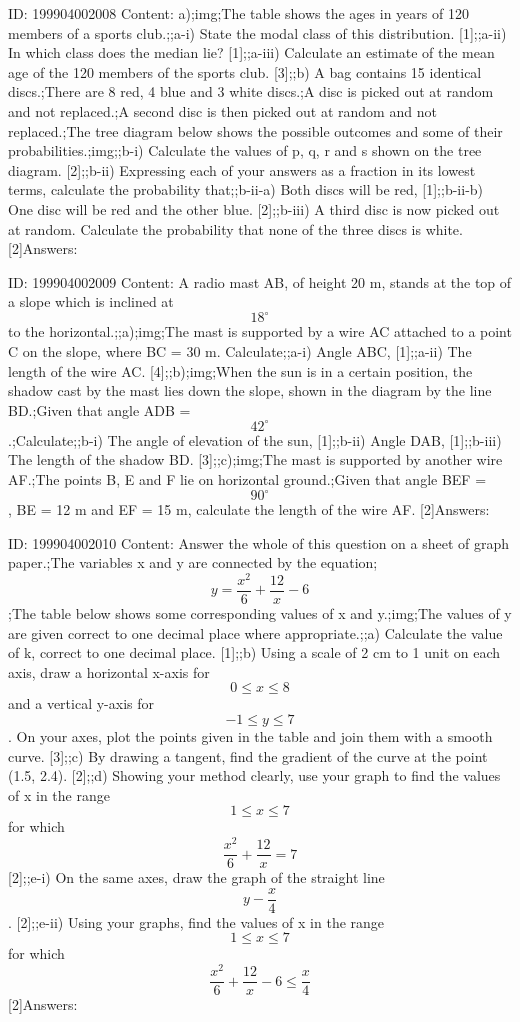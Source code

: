 \documentclass{article}
\begin{document}
ID: 199904002008
Content:
a);img;The table shows the ages in years of 120 members of a sports club.;;a-i) State the modal class of this distribution. [1];;a-ii) In which class does the median lie? [1];;a-iii) Calculate an estimate of the mean age of the 120 members of the sports club. [3];;b) A bag contains 15 identical discs.;There are 8 red, 4 blue and 3 white discs.;A disc is picked out at random and not replaced.;A second disc is then picked out at random and not replaced.;The tree diagram below shows the possible outcomes and some of their probabilities.;img;;b-i) Calculate the values of p, q, r and s shown on the tree diagram. [2];;b-ii) Expressing each of your answers as a fraction in its lowest terms, calculate the probability that;;b-ii-a) Both discs will be red, [1];;b-ii-b) One disc will be red and the other blue. [2];;b-iii) A third disc is now picked out at random. Calculate the probability that none of the three discs is white. [2]Answers:

ID: 199904002009
Content:
A radio mast AB, of height 20 m, stands at the top of a slope which is inclined at $$18^{\circ}$$ to the horizontal.;;a);img;The mast is supported by a wire AC attached to a point C on the slope, where BC = 30 m. Calculate;;a-i) Angle ABC, [1];;a-ii) The length of the wire AC. [4];;b);img;When the sun is in a certain position, the shadow cast by the mast lies down the slope, shown in the diagram by the line BD.;Given that angle ADB = $$42^{\circ}$$.;Calculate;;b-i) The angle of elevation of the sun, [1];;b-ii) Angle DAB, [1];;b-iii) The length of the shadow BD. [3];;c);img;The mast is supported by another wire AF.;The points B, E and F lie on horizontal ground.;Given that angle BEF = $$90^{\circ}$$, BE = 12 m and EF = 15 m, calculate the length of the wire AF. [2]Answers:

ID: 199904002010
Content:
Answer the whole of this question on a sheet of graph paper.;The variables x and y are connected by the equation;$$y = \frac{x^2}{6} + \frac{12}{x} - 6$$;The table below shows some corresponding values of x and y.;img;The values of y are given correct to one decimal place where appropriate.;;a) Calculate the value of k, correct to one decimal place. [1];;b) Using a scale of 2 cm to 1 unit on each axis, draw a horizontal x-axis for $$0 \leq x \leq 8$$  and a vertical y-axis for $$-1 \leq y \leq 7$$. On your axes, plot the points given in the table and join them with a smooth curve. [3];;c) By drawing a tangent, find the gradient of the curve at the point (1.5, 2.4). [2];;d) Showing your method clearly, use your graph to find the values of x in the range $$1 \leq x \leq 7$$ for which $$\frac{x^2}{6} + \frac{12}{x} = 7$$ [2];;e-i) On the same axes, draw the graph of the straight line $$y - \frac{x}{4}$$. [2];;e-ii) Using your graphs, find the values of x in the range $$1 \leq x \leq 7$$ for which $$\frac{x^2}{6} + \frac{12}{x} - 6 \leq \frac{x}{4}$$ [2]Answers:
\end{document}

